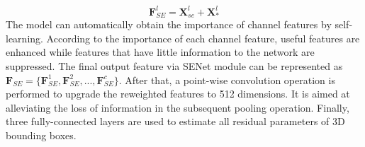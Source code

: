 \documentclass[letterpaper]{article}
\begin{document}
\begin{equation}
\mathbf{F}_{SE}^l = \mathbf{X}_{se}^l + \mathbf{X}_*^l
\end{equation}
The model can automatically obtain the importance of channel features by self-learning. According to the importance of each channel feature, useful features are enhanced while features that have little information to the network are suppressed. The final output feature via SENet module can be represented as $\mathbf{F}_{SE} = \{\mathbf{F}_{SE}^1,\mathbf{F}_{SE}^2,...,\mathbf{F}_{SE}^c\}$.
After that, a point-wise convolution operation is performed to upgrade the reweighted features to 512 dimensions. It is aimed at alleviating the loss of information in the subsequent pooling operation. Finally, three fully-connected layers are used to estimate all residual parameters of 3D bounding boxes.
\end{document}

